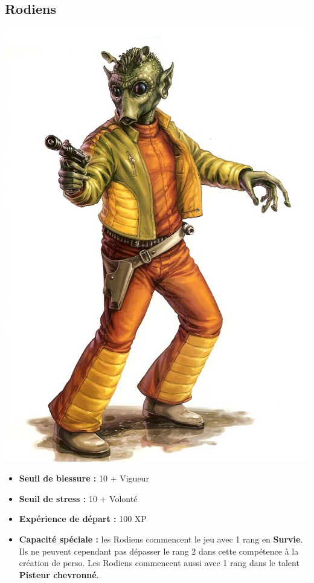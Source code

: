 \documentclass[twoside]{article}
\begin{document}
\subsection*{Rodiens}

\noindent\begin{minipage}{0.3\textwidth}
	\includegraphics[width=1\linewidth]{../_img/species/rodien}
\end{minipage}%
\hfill%
\begin{minipage}{0.7\textwidth}\raggedleft
	\begin{itemize}
		\item \textbf{Seuil de blessure :} 10 + Vigueur 
		\item \textbf{Seuil de stress :} 10 + Volonté 
		\item \textbf{Expérience de départ :} 100 XP
		\item \textbf{Capacité spéciale :} les Rodiens commencent le jeu avec 1 rang en \textbf{Survie}. Ils ne peuvent cependant pas dépasser le rang 2 dans cette compétence à la création de perso. Les Rodiens commencent aussi avec 1 rang dans le talent \textbf{Pisteur chevronné}.
	\end{itemize}
\end{minipage}
\end{document}
